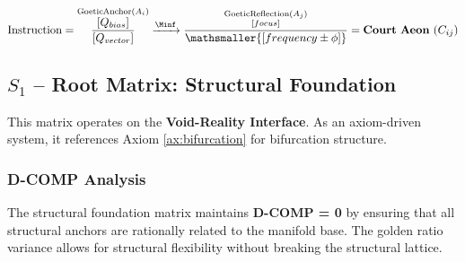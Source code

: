 
\begin{axiom}\label{ax:bifurcation}
\begin{equation}
\text{Instruction} = \overset{\text{GoeticAnchor} (A_i)}{\frac{[Q_{bias}]}{[Q_{vector}]}} \xrightarrow{\Minf} \overset{\text{GoeticReflection} (A_j)}{\frac{\scriptstyle{[focus]}}{\mathsmaller{[frequency\pm\phi]}}} = \mathbf{Court\ Aeon\ } (C_{ij})
\end{equation}
\end{axiom}

\subsection{$S_{1}$ -- Root Matrix: Structural Foundation}\label{sec:19.0.1}

This matrix operates on the \textbf{Void-Reality Interface}. As an axiom-driven system, it references Axiom \ref{ax:bifurcation} for bifurcation structure.

\subsubsection{D-COMP Analysis}

The structural foundation matrix maintains \textbf{D-COMP = 0} by ensuring that all structural anchors are rationally related to the manifold base. The golden ratio variance allows for structural flexibility without breaking the structural lattice.

